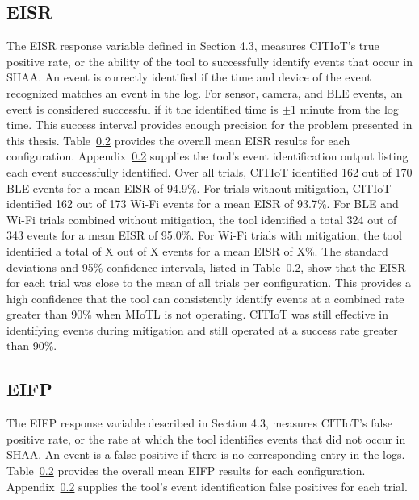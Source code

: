 \documentclass[12pt,letterpaper,oneside]{book}
\begin{document}
	
	\subsection{\ac{EISR}}
	The \ac{EISR} response variable defined in Section 4.3, measures \ac{CITIoT}'s true positive rate, or the ability of the tool to successfully identify events that occur in \ac{SHAA}. An event is correctly identified if the time and device of the event recognized matches an event in the log. For sensor, camera, and \ac{BLE} events, an event is considered successful if it the identified time is $\pm$1 minute from the log time. This success interval provides enough precision for the problem presented in this thesis. Table~\ref{} provides the overall mean \ac{EISR} results for each configuration. Appendix~\ref{} supplies the tool's event identification output listing each event successfully identified. Over all trials, \ac{CITIoT} identified 162 out of 170 \ac{BLE} events for a mean \ac{EISR} of 94.9\%. For trials without mitigation, \ac{CITIoT} identified 162 out of 173 Wi-Fi events for a mean \ac{EISR} of 93.7\%.  For \ac{BLE} and Wi-Fi trials combined without mitigation, the tool identified a total 324 out of 343 events for a mean \ac{EISR} of 95.0\%. For Wi-Fi trials with mitigation, the tool identified a total of X out of X events for a mean \ac{EISR} of X\%. The standard deviations and 95\% confidence intervals, listed in Table~\ref{}, show that the \ac{EISR} for each trial was close to the mean of all trials per configuration. This provides a high confidence that the tool can consistently identify events at a combined rate greater than 90\% when \ac{MIoTL} is not operating. \ac{CITIoT} was still effective in identifying events during mitigation and still operated at a success rate greater than 90\%.
	
	
	\subsection{\ac{EIFP}}
	The \ac{EIFP} response variable described in Section 4.3, measures \ac{CITIoT}'s false positive rate, or the rate at which the tool identifies events that did not occur in \ac{SHAA}. An event is a false positive if there is no corresponding entry in the logs. Table~\ref{} provides the overall mean \ac{EIFP} results for each configuration. Appendix~\ref{} supplies the tool's event identification false positives for each trial. 
	
\end{document}
